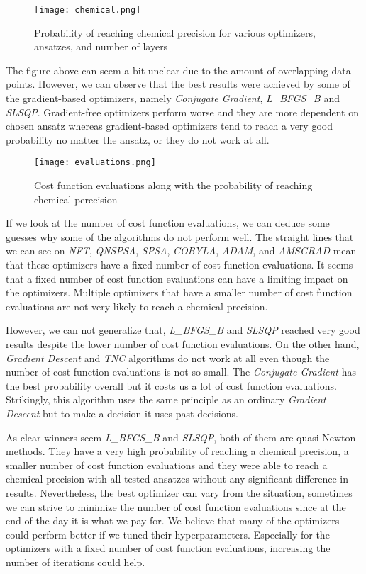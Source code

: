 \begin{figure}
    \centering
    \texttt{[image: chemical.png]}
    \caption{Probability of reaching chemical precision for various optimizers, ansatzes, and number of layers}
    \label{fig:chemical}
\end{figure}

The figure above can seem a bit unclear due to the amount of overlapping data points. However, we can observe that the best results were achieved by some of the gradient-based optimizers, namely \textit{Conjugate Gradient}, \textit{L\_BFGS\_B} and \textit{SLSQP}. Gradient-free optimizers perform worse and they are more dependent on chosen ansatz whereas gradient-based optimizers tend to reach a very good probability no matter the ansatz, or they do not work at all. 

\begin{figure}
    \centering
    \texttt{[image: evaluations.png]}
    \caption{Cost function evaluations along with the probability of reaching chemical perecision}
    \label{fig:evaluations}
\end{figure}

If we look at the number of cost function evaluations, we can deduce some guesses why some of the algorithms do not perform well. The straight lines that we can see on \textit{NFT}, \textit{QNSPSA}, \textit{SPSA}, \textit{COBYLA}, \textit{ADAM}, and \textit{AMSGRAD} mean that these optimizers have a fixed number of cost function evaluations. It seems that a fixed number of cost function evaluations can have a limiting impact on the optimizers. Multiple optimizers that have a smaller number of cost function evaluations are not very likely to reach a chemical precision.

However, we can not generalize that, \textit{L\_BFGS\_B} and \textit{SLSQP} reached very good results despite the lower number of cost function evaluations. On the other hand, \textit{Gradient Descent} and \textit{TNC} algorithms do not work at all even though the number of cost function evaluations is not so small. The \textit{Conjugate Gradient} has the best probability overall but it costs us a lot of cost function evaluations. Strikingly, this algorithm uses the same principle as an ordinary \textit{Gradient Descent} but to make a decision it uses past decisions.

As clear winners seem \textit{L\_BFGS\_B} and \textit{SLSQP}, both of them are quasi-Newton methods. They have a very high probability of reaching a chemical precision, a smaller number of cost function evaluations and they were able to reach a chemical precision with all tested ansatzes without any significant difference in results. Nevertheless, the best optimizer can vary from the situation, sometimes we can strive to minimize the number of cost function evaluations since at the end of the day it is what we pay for. We believe that many of the optimizers could perform better if we tuned their hyperparameters. Especially for the optimizers with a fixed number of cost function evaluations, increasing the number of iterations could help.